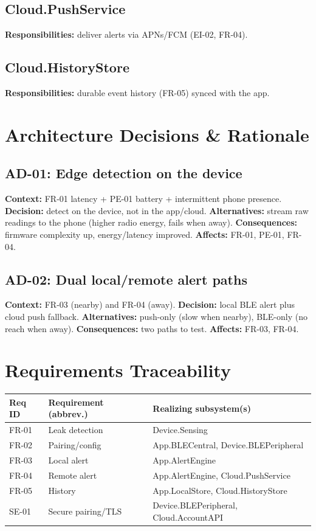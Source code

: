\documentclass[11pt,letterpaper]{article}
\begin{document}
\subsection{Cloud.PushService}
\textbf{Responsibilities:} deliver alerts via APNs/FCM (EI-02, FR-04).
\subsection{Cloud.HistoryStore}
\textbf{Responsibilities:} durable event history (FR-05) synced with the app.

\section{Architecture Decisions \& Rationale}
\subsection{AD-01: Edge detection on the device}
\textbf{Context:} FR-01 latency + PE-01 battery + intermittent phone presence.
\textbf{Decision:} detect on the device, not in the app/cloud. \textbf{Alternatives:}
stream raw readings to the phone (higher radio energy, fails when away).
\textbf{Consequences:} firmware complexity up, energy/latency improved. \textbf{Affects:} FR-01, PE-01, FR-04.
\subsection{AD-02: Dual local/remote alert paths}
\textbf{Context:} FR-03 (nearby) and FR-04 (away). \textbf{Decision:} local BLE
alert plus cloud push fallback. \textbf{Alternatives:} push-only (slow when nearby),
BLE-only (no reach when away). \textbf{Consequences:} two paths to test. \textbf{Affects:} FR-03, FR-04.

\section{Requirements Traceability}
\begin{table}[H]\begin{center}\begin{tabular}{ | p{2cm} | p{5.5cm} | p{5cm} |}\hline
\textbf{Req ID} & \textbf{Requirement (abbrev.)} & \textbf{Realizing subsystem(s)} \\ \hline
FR-01 & Leak detection & Device.Sensing \\ \hline
FR-02 & Pairing/config & App.BLECentral, Device.BLEPeripheral \\ \hline
FR-03 & Local alert & App.AlertEngine \\ \hline
FR-04 & Remote alert & App.AlertEngine, Cloud.PushService \\ \hline
FR-05 & History & App.LocalStore, Cloud.HistoryStore \\ \hline
SE-01 & Secure pairing/TLS & Device.BLEPeripheral, Cloud.AccountAPI \\ \hline
\end{tabular}\end{center}\end{table}


{}
\end{document}
